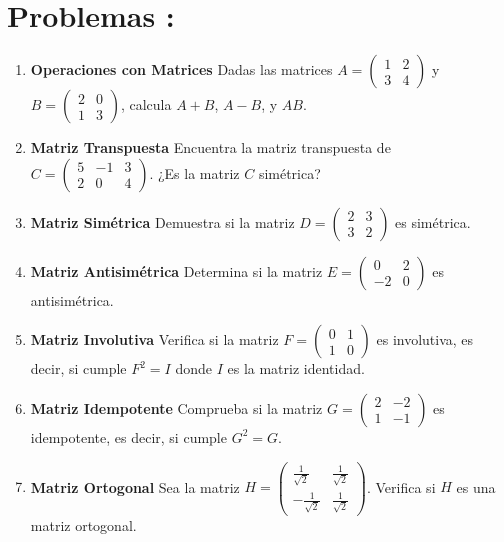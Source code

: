 \documentclass[10pt,a4paper]{article}
\begin{document}
\section*{Problemas :}
\begin{enumerate}
\item \textbf{Operaciones con Matrices}
Dadas las matrices $A = \begin{pmatrix} 1 & 2 \\ 3 & 4 \end{pmatrix}$ y $B = \begin{pmatrix} 2 & 0 \\ 1 & 3 \end{pmatrix}$, calcula $A + B$, $A - B$, y $AB$.

\item \textbf{Matriz Transpuesta}
Encuentra la matriz transpuesta de $C = \begin{pmatrix} 5 & -1 & 3 \\ 2 & 0 & 4 \end{pmatrix}$. ¿Es la matriz $C$ simétrica?

\item \textbf{Matriz Simétrica}
Demuestra si la matriz $D = \begin{pmatrix} 2 & 3 \\ 3 & 2 \end{pmatrix}$ es simétrica.

\item \textbf{Matriz Antisimétrica}
Determina si la matriz $E = \begin{pmatrix} 0 & 2 \\ -2 & 0 \end{pmatrix}$ es antisimétrica.

\item \textbf{Matriz Involutiva}
Verifica si la matriz $F = \begin{pmatrix} 0 & 1 \\ 1 & 0 \end{pmatrix}$ es involutiva, es decir, si cumple $F^2 = I$ donde $I$ es la matriz identidad.

\item \textbf{Matriz Idempotente}
Comprueba si la matriz $G = \begin{pmatrix} 2 & -2 \\ 1 & -1 \end{pmatrix}$ es idempotente, es decir, si cumple $G^2 = G$.

\item \textbf{Matriz Ortogonal}
Sea la matriz $H = \begin{pmatrix} \frac{1}{\sqrt{2}} & \frac{1}{\sqrt{2}} \\ -\frac{1}{\sqrt{2}} & \frac{1}{\sqrt{2}} \end{pmatrix}$. Verifica si $H$ es una matriz ortogonal.


\end{enumerate}
\end{document}
